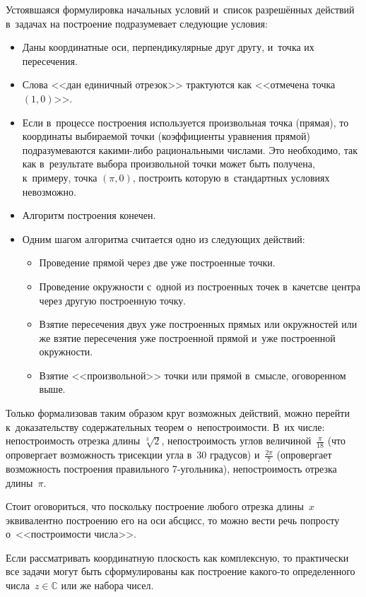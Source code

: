 \documentclass{article}
\begin{document}
Устоявшаяся формулировка начальных условий и~список разрешённых действий
в~задачах на построение подразумевает следующие условия:
\begin{itemize}
  \item Даны координатные оси, перпендикулярные друг другу, и~точка их
    пересечения.
  \item Слова <<дан единичный отрезок>> трактуются как <<отмечена точка $(1,
    0)$>>.
  \item Если в~процессе построения используется произвольная точка (прямая), то
    координаты выбираемой точки (коэффициенты уравнения прямой) подразумеваются
    какими-либо рациональными числами. Это необходимо, так как в~результате
    выбора произвольной точки может быть получена, к~примеру, точка $(\pi, 0)$,
    построить которую в~стандартных условиях невозможно.
  \item Алгоритм построения конечен.
  \item Одним шагом алгоритма считается одно из следующих действий:
    \begin{itemize}
      \item Проведение прямой через две уже построенные точки.
      \item Проведение окружности с~одной из построенных точек в~качетсве центра
        через другую построенную точку.
      \item Взятие пересечения двух уже построенных прямых или окружностей или
        же взятие пересечения уже построенной прямой и~уже построенной
        окружности.
      \item Взятие <<произвольной>> точки или прямой в~смысле, оговоренном выше.
    \end{itemize}
\end{itemize}

Только формализовав таким образом круг возможных действий, можно перейти
к~доказательству содержательных теорем о~непостроимости. В~их числе:
непостроимость отрезка длины $\sqrt[3]{2}$, непостроимость углов
величиной~$\frac{\pi}{18}$ (что опровергает возможность трисекции угла в~30
градусов) и~$\frac{2\pi}{7}$ (опровергает возможность построения
правильного 7-угольника), непостроимость отрезка длины~$\pi$.

\begin{remark}
  Стоит оговориться, что поскольку построение любого отрезка длины~$x$
  эквивалентно построению его на оси абсцисс, то можно вести речь попросту
  о~<<построимости числа>>.

  Если рассматривать координатную плоскость как комплексную, то практически все
  задачи могут быть сформулированы как построение какого-то определенного
  числа~$z \in \mathbb{C}$ или же набора чисел.
\end{remark}
\end{document}
